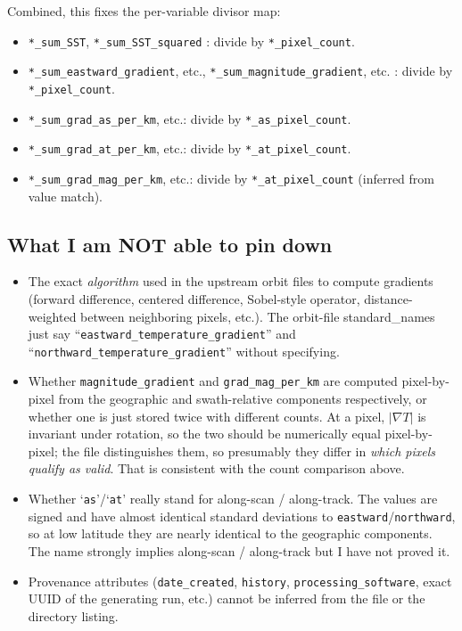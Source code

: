 \documentclass[11pt]{article}
\begin{document}
Combined, this fixes the per-variable divisor map:
\begin{itemize}
  \item \texttt{*\_sum\_SST}, \texttt{*\_sum\_SST\_squared} :
    divide by \texttt{*\_pixel\_count}.
  \item \texttt{*\_sum\_eastward\_gradient}, etc.,
    \texttt{*\_sum\_magnitude\_gradient}, etc. : divide by
    \texttt{*\_pixel\_count}.
  \item \texttt{*\_sum\_grad\_as\_per\_km}, etc.: divide by
    \texttt{*\_as\_pixel\_count}.
  \item \texttt{*\_sum\_grad\_at\_per\_km}, etc.: divide by
    \texttt{*\_at\_pixel\_count}.
  \item \texttt{*\_sum\_grad\_mag\_per\_km}, etc.: divide by
    \texttt{*\_at\_pixel\_count} (inferred from value match).
\end{itemize}

\subsection{What I am NOT able to pin down}

\begin{itemize}
  \item The exact \emph{algorithm} used in the upstream orbit
    files to compute gradients (forward difference, centered
    difference, Sobel-style operator, distance-weighted between
    neighboring pixels, etc.). The orbit-file standard\_names
    just say ``\texttt{eastward\_temperature\_gradient}'' and
    ``\texttt{northward\_temperature\_gradient}'' without
    specifying.
  \item Whether \texttt{magnitude\_gradient} and
    \texttt{grad\_mag\_per\_km} are computed pixel-by-pixel from
    the geographic and swath-relative components respectively,
    or whether one is just stored twice with different counts.
    At a pixel, $|\nabla T|$ is invariant under rotation, so the
    two should be numerically equal pixel-by-pixel; the file
    distinguishes them, so presumably they differ in
    \emph{which pixels qualify as valid}. That is consistent with
    the count comparison above.
  \item Whether `\texttt{as}'/`\texttt{at}' really stand for
    along-scan / along-track. The values are signed and have
    almost identical standard deviations to
    \texttt{eastward}/\texttt{northward}, so at low latitude they
    are nearly identical to the geographic components. The
    name strongly implies along-scan / along-track but I have
    not proved it.
  \item Provenance attributes (\texttt{date\_created},
    \texttt{history}, \texttt{processing\_software}, exact UUID
    of the generating run, etc.) cannot be inferred from the
    file or the directory listing.
\end{itemize}
\end{document}
